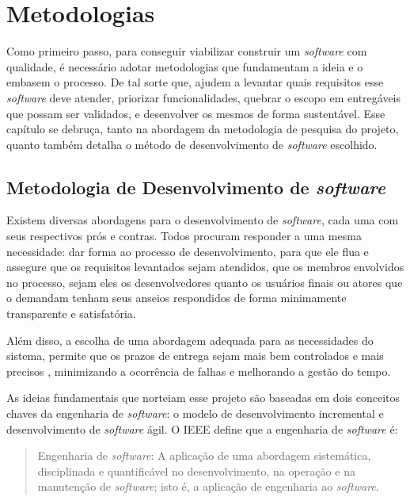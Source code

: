 \chapter{Metodologias}
\label{chapter:methodologies}

Como primeiro passo, para conseguir viabilizar construir um \textit{software}
com qualidade, é necessário adotar metodologias que fundamentam a ideia e o
embasem o processo. De tal sorte que, ajudem a levantar quais requisitos esse
\textit{software} deve atender, priorizar funcionalidades, quebrar o escopo em
entregáveis que possam ser validados, e desenvolver os mesmos de forma
sustentável. Esse capítulo se debruça, tanto na abordagem da metodologia de
pesquisa do projeto, quanto também detalha o método de desenvolvimento de
\textit{software} escolhido.

\section{Metodologia de Desenvolvimento de \textit{software}}

Existem diversas abordagens para o desenvolvimento de \textit{software}, cada
uma com seus respectivos prós e contras. Todos procuram responder a uma mesma
necessidade: dar forma ao processo de desenvolvimento, para que ele flua e
assegure que os requisitos levantados sejam atendidos, que os membros
envolvidos no processo, sejam eles os desenvolvedores quanto os usuários finais
ou atores que o demandam tenham seus anseios respondidos de forma minimamente
transparente e satisfatória.

Além disso, a escolha de uma abordagem adequada para as necessidades do
sistema, permite que os prazos de entrega sejam mais bem controlados e mais
precisos \cite{pressman:2021}, minimizando a ocorrência de falhas e melhorando
a gestão do tempo.

As ideias fundamentais que norteiam esse projeto são baseadas em dois conceitos
chaves da engenharia de \textit{software}: o modelo de desenvolvimento
incremental e desenvolvimento de \textit{software} ágil. O IEEE define que a
engenharia de \textit{software} é:

\begin{quote}
  Engenharia de \textit{software}: A aplicação de uma abordagem sistemática,
  disciplinada e quantificável no desenvolvimento, na operação e na manutenção de
  \textit{software}; isto é, a aplicação de engenharia ao \textit{software}.
  \cite[p.~67, tradução nossa]{ieee:1990}
\end{quote}

